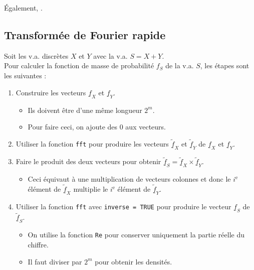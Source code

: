 \documentclass[10pt, french]{article}
\begin{document}
\begin{multicols*}{2}
Également, .

\columnbreak
\subsection{Transformée de Fourier rapide}

\begin{algo2}
Soit les v.a. discrètes $X$ et $Y$ avec la v.a. $S	=	X + Y$.	\\
Pour calculer la fonction de masse de probabilité $f_{S}$ de la v.a. $S$, les étapes sont les suivantes :
\begin{enumerate}
	\item	Construire les vecteurs $\underline{f}_{X}$ et $\underline{f}_{Y}$.
		\begin{itemize}
		\item	Ils doivent être d'une même longueur $2^{m}$.
		\item	Pour faire ceci, on ajoute des 0 aux vecteurs.
		\end{itemize}
	\item	Utiliser la fonction \texttt{fft} pour produire les vecteurs $\underline{\widetilde{f}}_{X}$ et $\underline{\widetilde{f}}_{Y}$ de $\underline{f}_{X}$ et $\underline{f}_{Y}$.
	\item	Faire le produit des deux vecteurs pour obtenir $\underline{\widetilde{f}}_{S}	=	\underline{\widetilde{f}}_{X} \times \underline{\widetilde{f}}_{Y}$.	
		\begin{itemize}
		\item	Ceci équivaut à une multiplication de vecteurs colonnes et donc le $i^{\text{e}}$ élément de $\underline{\widetilde{f}}_{X}$ multiplie le $i^{\text{e}}$ élément de $\underline{\widetilde{f}}_{Y}$.
		\end{itemize}
	\item	Utiliser la fonction \texttt{fft} avec \texttt{inverse = TRUE} pour produire le vecteur $\underline{f}_{S}$ de $\underline{\widetilde{f}}_{S}$.
		\begin{itemize}
		\item	On utilise la fonction \texttt{Re} pour conserver uniquement la partie réelle du chiffre.
		\item	Il faut diviser par $2^{m}$ pour obtenir les densités.
		\end{itemize}
\end{enumerate}
\end{algo2}


\end{multicols*}
\end{document}
